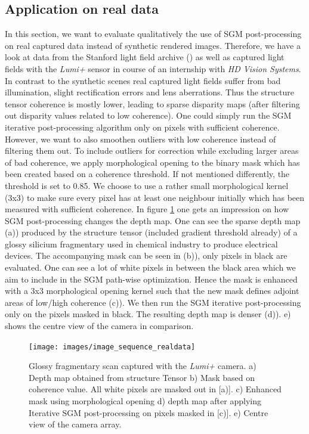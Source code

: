 \documentclass  [
  paper    = a4,
  BCOR     = 10mm,
  twoside,
  fontsize = 12pt,
  fleqn,
  toc      = bibnumbered,
  toc      = listofnumbered,
  numbers  = noendperiod,
  headings = normal,
  listof   = leveldown,
  version  = 3.03
]                                       {scrreprt}
\begin{document}
\subsection{Application on real data}
\label{sec:realdata}
In this section, we want to evaluate qualitatively the use of SGM post-processing on real captured data instead of synthetic rendered images. Therefore, we have a look at data from the Stanford light field archive (\cite{wiburn2004high}) as well as captured light fields with the \textit{Lumi+} sensor in course of an internship with \textit{HD Vision Systems}. In contrast to the synthetic scenes real captured light fields suffer from bad illumination, slight rectification errors and lens aberrations. Thus the structure tensor coherence is mostly lower, leading to sparse disparity maps (after filtering out disparity values related to low coherence). One could simply run the SGM iterative post-processing algorithm only on pixels with sufficient coherence. However, we want to also smoothen outliers with low coherence instead of filtering them out. To include outliers for correction while excluding larger areas of bad coherence, we apply morphological opening to the binary mask which has been created based on a coherence threshold. If not mentioned differently, the threshold is set to 0.85. We choose to use a rather small morphological kernel (3x3) to make sure every pixel has at least one neighbour initially which has been measured with sufficient coherence. In figure \ref{fig:imagesequencerealdata} one gets an impression on how SGM post-processing changes the depth map. One can see the sparse depth map (a)) produced by the structure tensor (included gradient threshold already) of a glossy silicium fragmentary used in chemical industry to produce electrical devices. The accompanying mask can be seen in (b)), only pixels in black are evaluated. One can see a lot of white pixels in between the black area which we aim to include in the SGM path-wise optimization. Hence the mask is enhanced with a 3x3 morphological opening kernel such that the new mask defines adjoint areas of low/high coherence (c)). We then run the SGM iterative post-processing only on the pixels masked in black. The resulting depth map is denser (d)). e) shows the centre view of the camera in comparison.

\begin{figure}[h!]
	\centering
	\texttt{[image: images/image\_sequence\_realdata]}
	\caption[Silicium scan with iterative SGM]{Glossy fragmentary scan captured with the \textit{Lumi+} camera. a) Depth map obtained from structure Tensor b) Mask based on coherence value. All white pixels are masked out in [a)]. c) Enhanced mask using morphological opening d) depth map after applying Iterative SGM post-processing  on pixels masked in [c)]. e) Centre view of the camera array.}
	\label{fig:imagesequencerealdata}
\end{figure}
\end{document}
